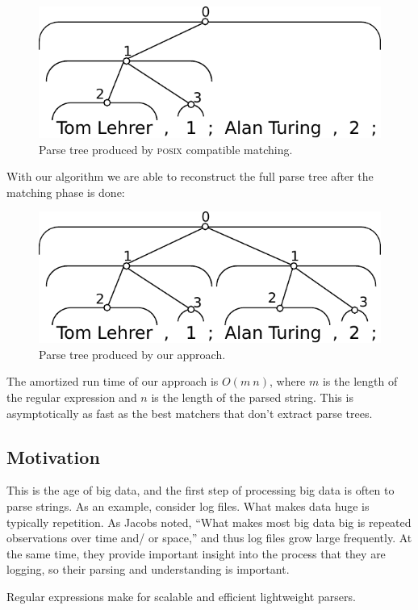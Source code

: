\documentclass[english]{sigplanconf}
\theoremstyle{definition}
\begin{document}
\begin{figure}[h]
\centering
\includegraphics[width=.75\linewidth]{graphs/posix_parse}
\caption{Parse tree produced by \textsc{posix} compatible matching.}
\end{figure}

With our algorithm we are able to reconstruct the full parse
tree after the matching phase is done:

\begin{figure}[h]
\centering
\includegraphics[width=.75\linewidth]{graphs/full_parse}
\caption{Parse tree produced by our approach.}
\end{figure}

The amortized run time of our approach is $O(m\: n)$, where $m$
is the length of the regular expression and $n$ is the length of
the parsed string. This is asymptotically as fast as the best matchers
that don't extract parse trees. 

\subsection{Motivation}

This is the age of big data, and the first step of processing big
data is often to parse strings. As an example, consider log files.
What makes data huge is typically repetition. As Jacobs\cite{Jaco09a}
noted, ``What makes most big data big is repeated observations over
time and/ or space,'' and thus log files grow large frequently. At
the same time, they provide important insight into the process that
they are logging, so their parsing and understanding is important. 

Regular expressions make for scalable and efficient lightweight parsers.\cite{Kart96a} 
\end{document}
